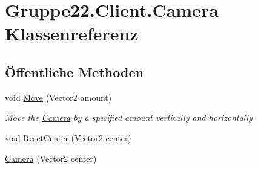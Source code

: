 \hypertarget{class_gruppe22_1_1_client_1_1_camera}{\section{Gruppe22.\-Client.\-Camera Klassenreferenz}
\label{class_gruppe22_1_1_client_1_1_camera}
}
\subsection*{Öffentliche Methoden}
\begin{DoxyCompactItemize}
\item 
void \hyperlink{class_gruppe22_1_1_client_1_1_camera_abf680aa4aded267b32bfef475b7bb501}{Move} (Vector2 amount)
\begin{DoxyCompactList}\small\item\em Move the \hyperlink{class_gruppe22_1_1_client_1_1_camera}{Camera} by a specified amount vertically and horizontally \end{DoxyCompactList}\item 
void \hyperlink{class_gruppe22_1_1_client_1_1_camera_a824e5423328b7b27da3bf7d81635eb7a}{Reset\-Center} (Vector2 center)
\item 
\hyperlink{class_gruppe22_1_1_client_1_1_camera_a2c0251a91cfa20eebd252632d2805717}{Camera} (Vector2 center)
\end{DoxyCompactItemize}
